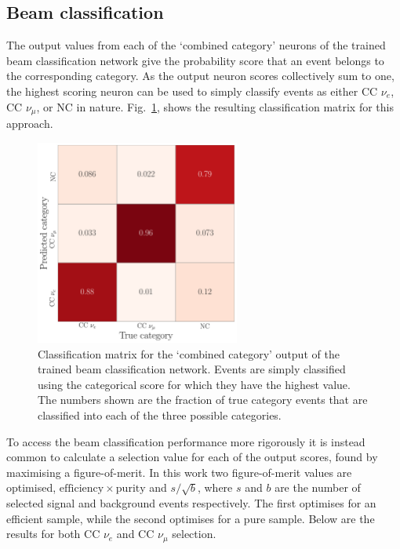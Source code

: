 \subsection{Beam classification} %
\label{sec:cvn_results_beam} %

The output values from each of the `combined category' neurons of the trained beam classification
network give the probability score that an event belongs to the corresponding category. As the
output neuron scores collectively sum to one, the highest scoring neuron can be used to simply
classify events as either CC $\nu_{e}$, CC $\nu_{\mu}$, or NC in nature.
Fig.~\ref{fig:final_comb_cat_confusion}, shows the resulting classification matrix for this
approach.

\begin{figure} %
    \includegraphics[width=0.6\textwidth]{diagrams/6-cvn/chipsnet/final_comb_cat_confusion.pdf}
    \caption[Classification matrix for the trained beam classification network.]
    {Classification matrix for the `combined category' output of the trained beam classification
        network. Events are simply classified using the categorical score for which they have the
        highest value. The numbers shown are the fraction of true category events that are
        classified into each of the three possible categories.}
    \label{fig:final_comb_cat_confusion}
\end{figure}

To access the beam classification performance more rigorously it is instead common to calculate a
selection value for each of the output scores, found by maximising a figure-of-merit. In this work
two figure-of-merit values are optimised, $\mathrm{efficiency}\times\mathrm{purity}$ and
$s/\sqrt{b}$, where $s$ and $b$ are the number of selected signal and background events
respectively. The first optimises for an efficient sample, while the second optimises for a pure
sample. Below are the results for both CC $\nu_{e}$ and CC $\nu_{\mu}$ selection.

